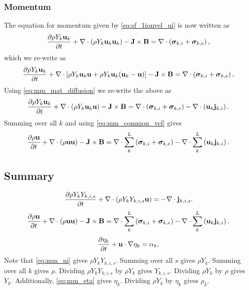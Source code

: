 \documentclass[a4paper,11pt]{report}
\begin{document}
\subsubsection{Momentum}
The equation for momentum given by \cref{eq:sf_1ionvel_ui} is now written as
\begin{equation*}
    \frac{\partial \rho Y_k \mathbf{u}_k}{\partial t} + \nabla \cdot \left( \rho Y_k \mathbf{u}_k \mathbf{u}_k \right) - \mathbf{J} \times \mathbf{B} = \nabla \cdot \left( \bm \sigma_{k,i} + \bm \sigma_{k,e} \right),
\end{equation*}
which we re-write as
\begin{equation*}
    \frac{\partial \rho Y_k \mathbf{u}_k}{\partial t} + \nabla \cdot \left[ \rho Y_k \mathbf{u}_k \mathbf{u} + \rho Y_k \mathbf{u}_k (\mathbf{u}_k - \mathbf{u})\right] - \mathbf{J} \times \mathbf{B} = \nabla \cdot \left( \bm \sigma_{k,i} + \bm \sigma_{k,e} \right),
\end{equation*}
Using \cref{eq:mm_mat_diffusion} we re-write the above as
\begin{equation*}
    \frac{\partial \rho Y_k \mathbf{u}_k}{\partial t} + \nabla \cdot \left( \rho Y_k \mathbf{u}_k \mathbf{u} \right) - \mathbf{J} \times \mathbf{B} = \nabla \cdot \left( \bm \sigma_{k,i} + \bm \sigma_{k,e} \right) - \nabla \cdot \left( \mathbf{u}_k \mathbf{j}_{k,i} \right).
\end{equation*}
Summing over all $k$ and using \cref{eq:mm_common_vel} gives
\begin{equation*}
    \frac{\partial \rho \mathbf{u}}{\partial t} + \nabla \cdot \left( \rho \mathbf{u} \mathbf{u} \right) - \mathbf{J} \times \mathbf{B} = \nabla \cdot \sum_k^L \left( \bm \sigma_{k,i} + \bm \sigma_{k,e} \right) - \nabla \cdot \sum_k^L \left( \mathbf{u}_k \mathbf{j}_{k,i} \right) .
\end{equation*}

\subsection{Summary}
\begin{equation}
    \label{eq:mm_ni}
    \frac{\partial \rho Y_k Y_{k,i,s}}{\partial t} + \nabla \cdot \left( \rho Y_k Y_{k,i,s} \mathbf{u} \right) = - \nabla \cdot \mathbf{j}_{k,i,s}.
\end{equation}
\begin{equation}
    \label{eq:mm_ui}
    \frac{\partial \rho \mathbf{u}}{\partial t} + \nabla \cdot \left( \rho \mathbf{u} \mathbf{u} \right) - \mathbf{J} \times \mathbf{B} = \nabla \cdot \sum_k^L \left( \bm \sigma_{k,i} + \bm \sigma_{k,e} \right) - \nabla \cdot \sum_k^L \left( \mathbf{u}_k \mathbf{j}_{k,i} \right) .
\end{equation}
\begin{equation}
    \label{eq:mm_eta}
    \frac{\partial \eta_k}{\partial t} + \mathbf{u} \cdot \nabla \eta_k = \alpha_k,
\end{equation}
Note that \cref{eq:mm_ni} gives $\rho Y_k Y_{k,i,s}$. Summing over all $s$ gives $\rho Y_k$. Summing over all $k$ gives $\rho$. Dividing $\rho Y_k Y_{k,i,s}$ by $\rho Y_k$ gives $Y_{k,i,s}$. Dividing $\rho Y_k$ by $\rho$ gives $Y_k$. Additionally, \cref{eq:mm_eta} gives $\eta_k$. Dividing $\rho Y_k$ by $\eta_k$ gives $\rho_k$.
\end{document}
